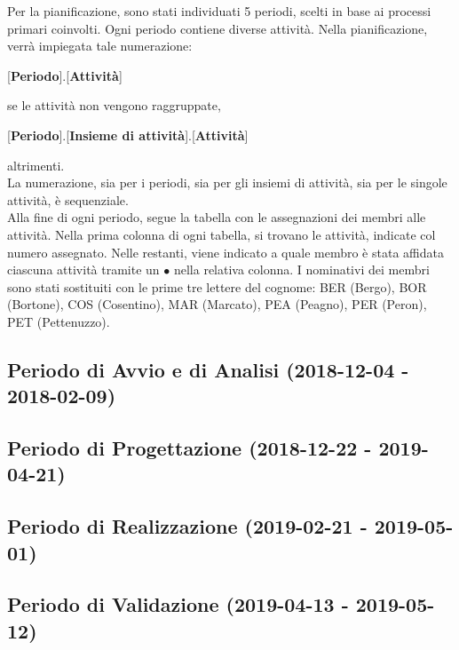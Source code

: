 Per la pianificazione, sono stati individuati 5 periodi, scelti in base ai processi primari coinvolti. Ogni periodo contiene diverse attività. Nella pianificazione, verrà impiegata tale numerazione:
\begin{center}
	[\textbf{Periodo}].[\textbf{Attività}]
\end{center}
se le attività non vengono raggruppate,
\begin{center}
	[\textbf{Periodo}].[\textbf{Insieme di attività}].[\textbf{Attività}]
\end{center}
altrimenti.\\
La numerazione, sia per i periodi, sia per gli insiemi di attività, sia per le singole attività, è sequenziale.\\
Alla fine di ogni periodo, segue la tabella con le assegnazioni dei membri alle attività. Nella prima colonna di ogni tabella, si trovano le attività, indicate col numero assegnato. Nelle restanti, viene indicato a quale membro è stata affidata ciascuna attività tramite un $\bullet$ nella relativa colonna. I nominativi dei membri sono stati sostituiti con le prime tre lettere del cognome: BER (Bergo), BOR (Bortone), COS (Cosentino), MAR (Marcato), PEA (Peagno), PER (Peron), PET (Pettenuzzo).

\newpage
\subsection{Periodo di Avvio e di Analisi (2018-12-04 - 2018-02-09)}
	

\newpage
\subsection{Periodo di Progettazione (2018-12-22 - 2019-04-21)}	
	
	
\newpage	
\subsection{Periodo di Realizzazione (2019-02-21 - 2019-05-01)}
	
	
\newpage	
\subsection{Periodo di Validazione (2019-04-13 - 2019-05-12)}
	
	
\newpage
